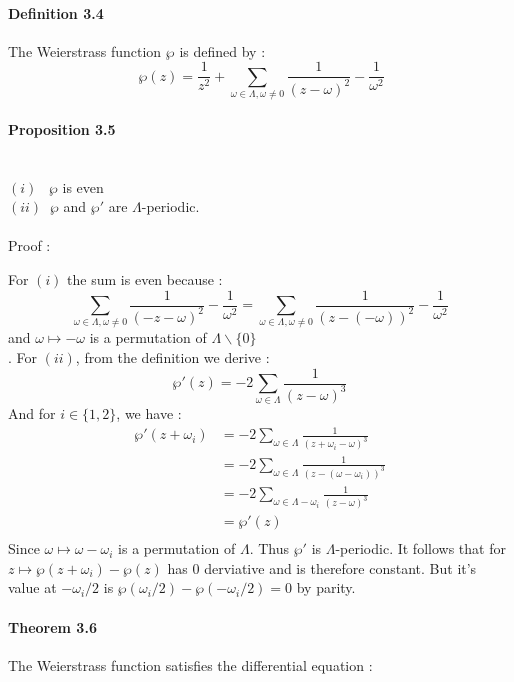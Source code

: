 \documentclass[letterpaper,10pt]{article}
\begin{document}
\paragraph{Definition 3.4} The Weierstrass function $\wp$ is defined by : 
\[\ \wp(z) = \frac{1}{z^2} +  \sum_{\omega \in \Lambda , \omega \neq 0 }\frac{1}{(z - \omega)^2} - \frac{1}{\omega^2} \]
\paragraph{Proposition 3.5} \textbf{ }\\ $(i)\;\;\; \wp$ is even \\  $(ii)\;\;\wp$ and $\wp'$ are $\Lambda$-periodic.

{\itshape \paragraph{} Proof :}
For $(i)$ the sum is even because : \[\sum_{\omega \in \Lambda , \omega \neq 0 }\frac{1}{(-z - \omega)^2} - \frac{1}{\omega^2} = 
 \sum_{\omega \in \Lambda , \omega \neq 0 }\frac{1}{(z -(- \omega))^2} - \frac{1}{\omega^2}\] and $\omega \mapsto -\omega$ is 
 a permutation of $\Lambda\backslash \{0\}$\\.
For $(ii)$, from the definition we derive : \[ \wp'(z) = -2\sum_{\omega\in\Lambda} \frac{1}{(z-\omega)^3} \]
And for $i\in \{1,2\}$, we have : \begin{align*} \wp'(z + \omega_i) &= -2\sum_{\omega\in\Lambda} \frac{1}{(z + \omega_i-\omega)^3}\\
  &= -2\sum_{\omega\in\Lambda} \frac{1}{(z - (\omega-\omega_i))^3}\\
  &= -2\sum_{\omega\in\Lambda - \omega_i} \frac{1}{(z - \omega)^3}\\
  &= \wp'(z)\\
\end{align*}%
Since $\omega \mapsto \omega-\omega_i$ is a permutation of $\Lambda$. Thus $\wp'$ is  $\Lambda$-periodic.
It follows that for $z\mapsto \wp(z + \omega_i) - \wp(z)$ has 0 derviative and is therefore constant. But it's value at $-\omega_i/2$ is 
$\wp(\omega_i/2) - \wp(-\omega_i/2) = 0$ by parity.

\paragraph{Theorem 3.6} The Weierstrass function satisfies the differential equation : 
\end{document}
